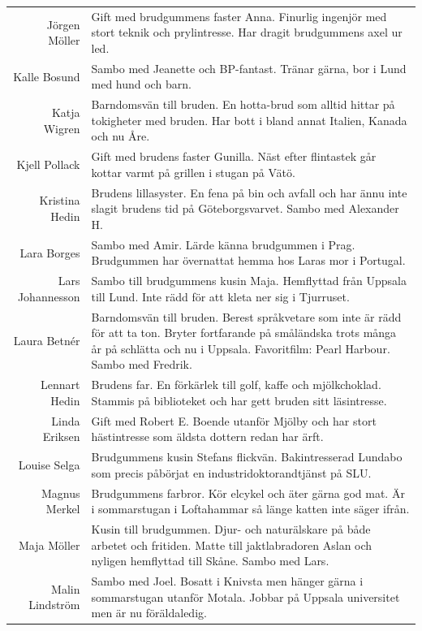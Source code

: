 \documentclass[a5paper]{article}
\begin{document}
\begin{longtable}[l]{N|L}
				Jörgen Möller	&	Gift med brudgummens faster Anna. Finurlig ingenjör med stort teknik och prylintresse. Har dragit brudgummens axel ur led.	\\
				Kalle Bosund	&	Sambo med Jeanette och BP-fantast. Tränar gärna, bor i Lund med hund och barn.	\\
				Katja Wigren	&	Barndomsvän till bruden. En hotta-brud som alltid hittar på tokigheter med bruden. Har bott i bland annat Italien, Kanada och nu Åre.	\\
				Kjell Pollack	&	Gift med brudens faster Gunilla. Näst efter flintastek går kottar varmt på grillen i stugan på Vätö.	\\
				Kristina Hedin	&	Brudens lillasyster. En fena på bin och avfall och har ännu inte slagit brudens tid på Göteborgsvarvet. Sambo med Alexander H.	\\
				Lara Borges	&	Sambo med Amir. Lärde känna brudgummen i Prag. Brudgummen har övernattat hemma hos Laras mor i Portugal.	\\
				Lars Johannesson	&	Sambo till brudgummens kusin Maja. Hemflyttad från Uppsala till Lund. Inte rädd för att kleta ner sig i Tjurruset.	\\
				Laura Betnér	&	Barndomsvän till bruden. Berest språkvetare som inte är rädd för att ta ton. Bryter fortfarande på småländska trots många år på schlätta och nu i Uppsala. Favoritfilm: Pearl Harbour. Sambo med Fredrik.	\\
				Lennart Hedin	&	Brudens far. En förkärlek till golf, kaffe och mjölkchoklad. Stammis på biblioteket och har gett bruden sitt läsintresse.	\\
				Linda Eriksen	&	Gift med Robert E. Boende utanför Mjölby och har stort hästintresse som äldsta dottern redan har ärft.	\\
				Louise Selga	&	Brudgummens kusin Stefans flickvän. Bakintresserad Lundabo som precis påbörjat en industridoktorandtjänst på SLU. 	\\
				Magnus Merkel	&	Brudgummens farbror. Kör elcykel och äter gärna god mat. Är i sommarstugan i Loftahammar så länge katten inte säger ifrån.	\\
				Maja Möller	&	Kusin till brudgummen. Djur- och naturälskare på både arbetet och fritiden. Matte till jaktlabradoren Aslan och nyligen hemflyttad till Skåne. Sambo med Lars.	\\
				Malin Lindström	&	Sambo med Joel. Bosatt i Knivsta men hänger gärna i sommarstugan utanför Motala. Jobbar på Uppsala universitet men är nu föräldaledig.	\\

\end{longtable}
\end{document}
